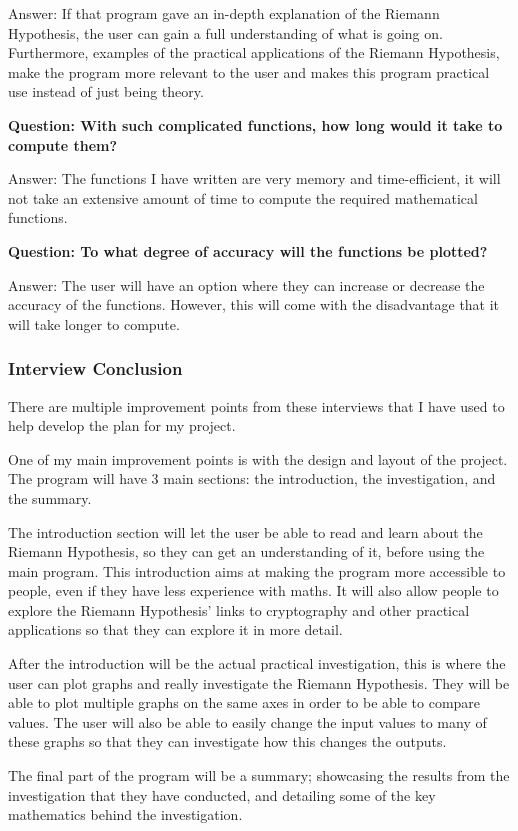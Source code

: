 \documentclass{article}
\begin{document}
Answer: If that program gave an in-depth explanation of the Riemann Hypothesis, the user can gain a full understanding of what is going on. Furthermore, examples of the practical applications of the Riemann Hypothesis, make the program more relevant to the user and makes this program practical use instead of just being theory.

\textbf{Question: With such complicated functions, how long would it take to compute them?}

Answer: The functions I have written are very memory and time-efficient, it will not take an extensive amount of time to compute the required mathematical functions.

\textbf{Question: To what degree of accuracy will the functions be plotted?}

Answer: The user will have an option where they can increase or decrease the accuracy of the functions. However, this will come with the disadvantage that it will take longer to compute.

\subsubsection{Interview Conclusion}
There are multiple improvement points from these interviews that I have used to help develop the plan for my project.

One of my main improvement points is with the design and layout of the project. The program will have 3 main sections: the introduction, the investigation, and the summary.

The introduction section will let the user be able to read and learn about the Riemann Hypothesis, so they can get an understanding of it, before using the main program. This introduction aims at making the program more accessible to people, even if they have less experience with maths. It will also allow people to explore the Riemann Hypothesis’ links to cryptography and other practical applications so that they can explore it in more detail.

After the introduction will be the actual practical investigation, this is where the user can plot graphs and really investigate the Riemann Hypothesis. They will be able to plot multiple graphs on the same axes in order to be able to compare values. The user will also be able to easily change the input values to many of these graphs so that they can investigate how this changes the outputs.

The final part of the program will be a summary; showcasing the results from the investigation that they have conducted, and detailing some of the key mathematics behind the investigation.
\end{document}
